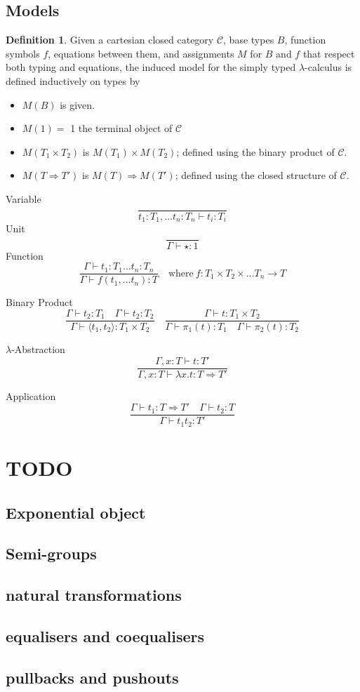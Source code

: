 \documentclass{article}
\theoremstyle{definition}
\newtheorem{definition}{Definition}[section]
\newcommand{\C}{\mathcal{C}}
\begin{document}
\subsection{Models}
\begin{definition}
    Given a cartesian closed category $\C$,
    base types $B$,
    function symbols $f$,
    equations between them,
    and assignments $M$ for $B$ and $f$ that respect both typing and equations,
    the induced model for the simply typed $\lambda$-calculus is defined inductively on types by
    \begin{itemize}
        \item $M(B)$ is given.
        \item $M(1) =$ 1 the terminal object of $\C$
        \item $M(T_1 \times T_2)$ is $M(T_1) \times M(T_2)$;
            defined using the binary product of $\C$.
        \item $M(T \Rightarrow T\prime)$ is $M(T) \Rightarrow M(T\prime)$;
            defined using the closed structure of $\C$.
    \end{itemize}
    Variable
    $$
    \frac{}{t_1 : T_1, \dots t_n : T_n \vdash t_i : T_i}
    $$
    Unit
    $$
    \frac{}{\Gamma \vdash \star : 1}
    $$
    Function
    $$
    \frac{\Gamma \vdash t_1 : T_1 \dots t_n : T_n}{\Gamma \vdash f(t_1,\dots t_n) : T}
    \quad\textrm{where}\ f : T_1 \times T_2 \times \dots T_n \rightarrow T
    $$

    Binary Product
    $$
    \frac
    {\Gamma \vdash t_2 : T_1 \quad \Gamma \vdash t_2 : T_2}
    {\Gamma \vdash \langle t_1, t_2 \rangle : T_1 \times T_2}
    \quad
    \frac
    {\Gamma \vdash t : T_1 \times T_2}
    {\Gamma \vdash \pi_1(t) : T_1 \quad \Gamma \vdash \pi_2(t) : T_2}
    $$

    $\lambda$-Abstraction
    $$
    \frac
    {\Gamma, x : T \vdash t : T\prime}
    {\Gamma, x : T \vdash \lambda x.t : T \Rightarrow T\prime}
    $$

    Application
    $$
    \frac
    {\Gamma \vdash t_1 : T \Rightarrow T\prime \quad \Gamma \vdash t_2 : T}
    {\Gamma \vdash t_1 t_2 : T\prime}
    $$
\end{definition}

\section{TODO}
\subsection{Exponential object}
\subsection{Semi-groups}
\subsection{natural transformations}
\subsection{equalisers and coequalisers}
\subsection{pullbacks and pushouts}
\end{document}
